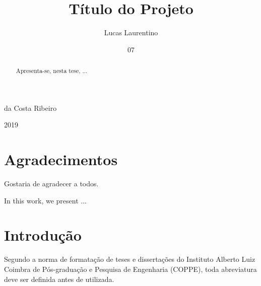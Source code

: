 \documentclass[grad,numbers]{coppe}
\begin{document}
    \title{Título do Projeto}
    \author{Lucas Laurentino}{da Costa Ribeiro}
    
    
    
    
    \date{07}{2019}
    
    
    \maketitle
    
    \frontmatter

\dedication{A alguém cujo valor é digno desta dedicatória.}

\chapter*{Agradecimentos}

  Gostaria de agradecer a todos.

\begin{abstract}

  Apresenta-se, nesta tese, ...

\end{abstract}

\begin{foreignabstract}

In this work, we present ...

\end{foreignabstract}

\tableofcontents
\listoffigures
\listoftables
\printlosymbols
\printloabbreviations

\mainmatter
\chapter{Introdução}

  Segundo a norma de formatação de teses e dissertações do
  Instituto Alberto Luiz Coimbra de Pós-graduação e Pesquisa de
  Engenharia (COPPE), toda abreviatura deve ser definida antes de
  utilizada.
\end{document}
